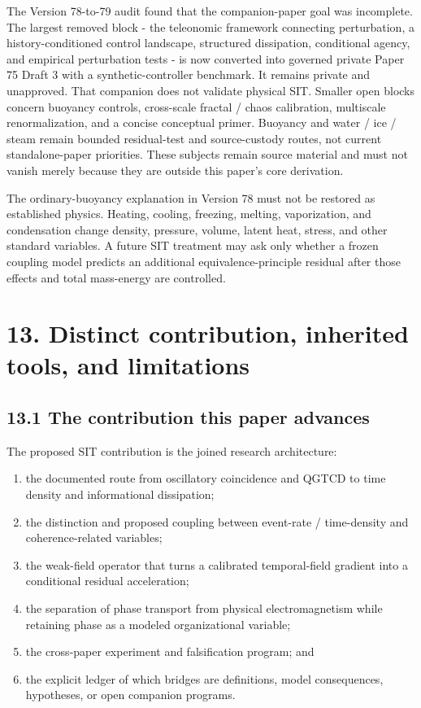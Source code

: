 \documentclass[
  american,
  11pt,
  letterpaper,
]{article}
\providecommand{\tightlist}{%
  \setlength{\itemsep}{0pt}\setlength{\parskip}{0pt}}
\begin{document}
The Version 78-to-79 audit found that the companion-paper goal was incomplete. The largest removed block - the teleonomic framework connecting perturbation, a history-conditioned control landscape, structured dissipation, conditional agency, and empirical perturbation tests - is now converted into governed private Paper 75 Draft 3 with a synthetic-controller benchmark. It remains private and unapproved. That companion does not validate physical SIT. Smaller open blocks concern buoyancy controls, cross-scale fractal / chaos calibration, multiscale renormalization, and a concise conceptual primer. Buoyancy and water / ice / steam remain bounded residual-test and source-custody routes, not current standalone-paper priorities. These subjects remain source material and must not vanish merely because they are outside this paper's core derivation.

The ordinary-buoyancy explanation in Version 78 must not be restored as established physics. Heating, cooling, freezing, melting, vaporization, and condensation change density, pressure, volume, latent heat, stress, and other standard variables. A future SIT treatment may ask only whether a frozen coupling model predicts an additional equivalence-principle residual after those effects and total mass-energy are controlled.

\section{13. Distinct contribution, inherited tools, and limitations}\label{distinct-contribution-inherited-tools-and-limitations}

\subsection{13.1 The contribution this paper advances}\label{the-contribution-this-paper-advances}

The proposed SIT contribution is the joined research architecture:

\begin{enumerate}
\def\labelenumi{\arabic{enumi}.}
\tightlist
\item
  the documented route from oscillatory coincidence and QGTCD to time density and informational dissipation;
\item
  the distinction and proposed coupling between event-rate / time-density and coherence-related variables;
\item
  the weak-field operator that turns a calibrated temporal-field gradient into a conditional residual acceleration;
\item
  the separation of phase transport from physical electromagnetism while retaining phase as a modeled organizational variable;
\item
  the cross-paper experiment and falsification program; and
\item
  the explicit ledger of which bridges are definitions, model consequences, hypotheses, or open companion programs.
\end{enumerate}
\end{document}
